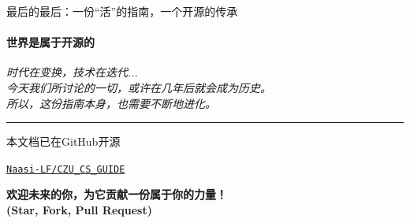 \documentclass{beamer}
\newcommand{\hrefcol}[2]{\textcolor{cyan}{\href{#1}{#2}}}
\begin{document}
\begin{frame}{最后的最后：一份“活”的指南，一个开源的传承}
     \framesubtitle{世界是属于开源的}
    \vfill
    \begin{center}
        \large
        \textit{时代在变换，技术在迭代...} \\
        \textit{今天我们所讨论的一切，或许在几年后就会成为历史。} \\
        \vspace{0.3cm}
        \textit{所以，这份指南本身，也需要不断地进化。}
    \end{center}

    \vfill
    \rule{0.8\textwidth}{0.4pt}
    \vfill

    \begin{center}
        \large
        本文档已在GitHub开源
        \vspace{0.5cm}

        \huge
        \hrefcol{https://github.com/Naasi-LF/CZU_CS_GUIDE}{\texttt{Naasi-LF/CZU\_CS\_GUIDE}}
        
        \vspace{0.5cm}
        \large
        \textbf{欢迎未来的你，为它贡献一份属于你的力量！} \\
        \large
        \textbf{(Star, Fork, Pull Request)}
    \end{center}
    \vfill
\end{frame}

\end{document}
